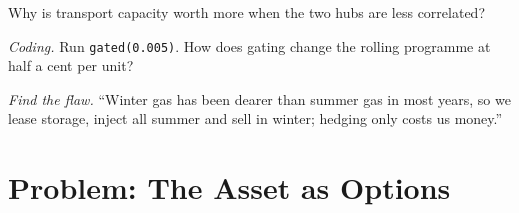 \begin{exercise}[$\star\star$]\label{exo:s2:storage-transport-and-physical-optionality:6}
Why is transport capacity worth more when the two hubs are less correlated?
\end{exercise}

\begin{exercise}[$\star\star\star$]\label{exo:s2:storage-transport-and-physical-optionality:7}
\emph{Coding.} Run \texttt{gated(0.005)}. How does gating change the rolling programme at half a cent per unit?
\end{exercise}

\begin{exercise}[$\star\star\star$]\label{exo:s2:storage-transport-and-physical-optionality:8}
\emph{Find the flaw.} ``Winter gas has been dearer than summer gas in most years, so we lease storage, inject all summer and sell in winter; hedging
only costs us money.''
\end{exercise}

\section{Problem: The Asset as Options}

